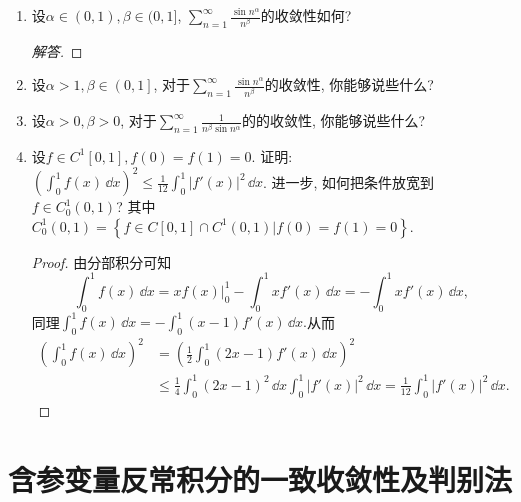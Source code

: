 \begin{b}
\begin{enumerate}
\begin{proof}
由于\(\frac{p+1}{2}>1,f'(x)\leqslant\frac{1}{2}\), 我们有\(h'(t)\geqslant 0\). 
这说明\(h(t)\)单调递增, 从\(h(0)=0\)得\(h(t)\geqslant 0\), 
因此\(g'(t)\geqslant 0\), 从\(g(0)=0\)得\(g(t)\geqslant 0,\) 即
\[\int_{0}^{t}f^p(x)\,\dd x\leqslant\left(\int_{0}^{t}f(x)\,\dd x\right)^{(p+1)/2},\]
令\(t\rightarrow+\infty\)即得结论.
\end{proof}
\item 设\(\alpha\in(0,1),\beta\in(0,1]\), \(\sum_{n=1}^{\infty}\frac{\sin n^\alpha}{n^\beta}\)的收敛性如何?
\begin{proof}[解答]

\end{proof}
\item 设\(\alpha>1,\beta\in\left(0,1\right]\), 对于\(\sum_{n=1}^{\infty}\frac{\sin n^\alpha}{n^\beta}\)的收敛性, 你能够说些什么?
\item 设\(\alpha>0,\beta>0\), 对于\(\sum_{n=1}^{\infty}\frac{1}{n^\beta\sin n^\alpha}\)的的收敛性, 你能够说些什么?
\item 设\(f\in C^1[0,1],f(0)=f(1)=0\). 证明: \(\left(\int_{0}^{1}f(x)\,\dd x\right)^2\leqslant\frac{1}{12}\int_{0}^{1}|f'(x)|^2\,\dd x\). 
进一步, 如何把条件放宽到\(f\in C_0^1(0,1)\)? 其中\(C_0^1(0,1)=\left\lbrace f\in C[0,1]\cap C^1(0,1)\big|f(0)=f(1)=0\right\rbrace \).
\begin{proof}
由分部积分可知\[\int_{0}^{1}f(x)\,\dd x=xf(x)\big|_0^1-\int_{0}^{1}xf'(x)\,\dd x=-\int_{0}^{1}xf'(x)\,\dd x,\]
同理\(\int_{0}^{1}f(x)\,\dd x=-\int_{0}^{1}(x-1)f'(x)\,\dd x.\)从而
\[\begin{split}
\left(\int_{0}^{1}f(x)\,\dd x\right)^2&=\left(\frac{1}{2}\int_{0}^{1}(2x-1)f'(x)\,\dd x\right)^2\\
&\leqslant\frac{1}{4}\int_{0}^{1}(2x-1)^2\,\dd x\int_{0}^{1}|f'(x)|^2\,\dd x
=\frac{1}{12}\int_{0}^{1}|f'(x)|^2\,\dd x.
\end{split}\]
\end{proof}
\end{enumerate}
\end{b}

\section{含参变量反常积分的一致收敛性及判别法}
